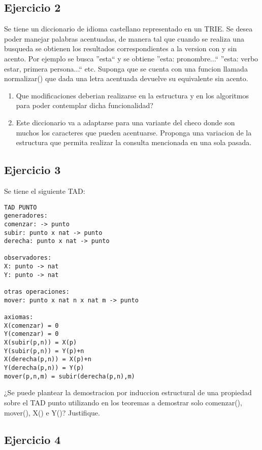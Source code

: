 \documentclass[10pt, a4paper]{article}
\begin{document}
\subsection*{Ejercicio 2}

Se tiene un diccionario de idioma castellano representado en un TRIE. Se desea poder manejar palabras acentuadas, de manera tal que cuando se realiza una busqueda se obtienen los resultados correspondientes a la version con y sin acento. Por ejemplo se busca ''esta`` y se obtiene ''esta: pronombre...`` ''esta: verbo estar, primera persona...`` etc. Suponga que se cuenta con una funcion llamada normalizar() que dada una letra acentuada devuelve su equivalente sin acento.

\begin{enumerate}
 \item Que modificaciones deberian realizarse en la estructura y en los algoritmos para poder contemplar dicha funcionalidad?
 \item Este diccionario va a adaptarse para una variante del checo donde son muchos los caracteres que pueden acentuarse. Proponga una variacion de la estructura que permita realizar la consulta mencionada en una sola pasada.
\end{enumerate}

\subsection*{Ejercicio 3}

Se tiene el siguiente TAD:

\begin{verbatim}
TAD PUNTO
generadores:
comenzar: -> punto
subir: punto x nat -> punto
derecha: punto x nat -> punto

observadores:
X: punto -> nat
Y: punto -> nat

otras operaciones:
mover: punto x nat n x nat m -> punto

axiomas:
X(comenzar) = 0
Y(comenzar) = 0
X(subir(p,n)) = X(p)
Y(subir(p,n)) = Y(p)+n
X(derecha(p,n)) = X(p)+n
Y(derecha(p,n)) = Y(p)
mover(p,n,m) = subir(derecha(p,n),m)
\end{verbatim}

¿Se puede plantear la demostracion por induccion estructural de una propiedad sobre el TAD punto utilizando en los teoremas a demostrar solo comenzar(), mover(), X() e Y()? Justifique.

\subsection*{Ejercicio 4}
\end{document}

